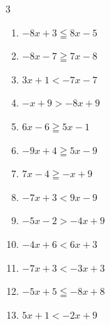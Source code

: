 \begin{multicols}{3}
\begin{enumerate}

  \item $-8x+3\leqq 8x-5$


  \item $-8x-7\geqq 7x-8$


  \item $3x+1<-7x-7$


  \item $-x+9>-8x+9$

        \phantom{$\displaystyle x>0$}

  \item $6x-6\geqq 5x-1$

        \phantom{$\displaystyle x\geqq 5$}

  \item $-9x+4\geqq 5x-9$


  \item $7x-4\geqq -x+9$


  \item $-7x+3<9x-9$


  \item $-5x-2>-4x+9$

        \phantom{$\displaystyle x<-11$}

  \item $-4x+6<6x+3$


\columnbreak %

\resetques

  \item $-7x+3<-3x+3$

        \phantom{$\displaystyle x>0$}

  \item $-5x+5\leqq -8x+8$

        \phantom{$\displaystyle x\leqq 1$}

  \item $5x+1<-2x+9$


\end{enumerate}
\end{multicols}
